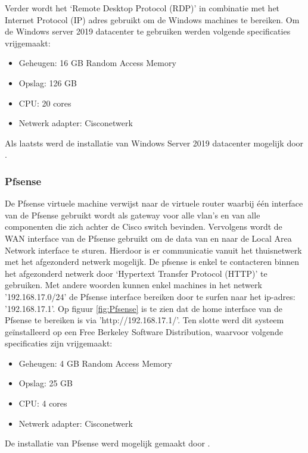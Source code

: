 Verder wordt het ‘Remote Desktop Protocol (RDP)’ in combinatie met het Internet Protocol (IP) adres gebruikt om de Windows machines te bereiken.
\newline
\newline
Om de Windows server 2019 datacenter te gebruiken werden volgende specificaties vrijgemaakt:

\begin{itemize}
	\item Geheugen: 16 GB Random Access Memory
	\item Opslag: 126 GB
	\item CPU: 20 cores
	\item Netwerk adapter: Cisco\textunderscore netwerk
\end{itemize}

Als laatsts werd de installatie van Windows Server 2019 datacenter mogelijk door \cite{Win19_InstallationGuide}. 

\subsubsection{Pfsense}
De Pfsense virtuele machine verwijst naar de virtuele router waarbij één interface van de Pfsense gebruikt wordt als gateway voor alle vlan’s en van alle componenten die zich achter de Cisco switch bevinden. Vervolgens wordt de WAN interface van de Pfsense gebruikt om de data van en naar de Local Area Network interface te sturen. Hierdoor is er communicatie vanuit het thuisnetwerk met het afgezonderd netwerk mogelijk.
\newline
\newline
De pfsense is enkel te contacteren binnen het afgezonderd netwerk door ‘Hypertext Transfer Protocol (HTTP)’ te gebruiken. Met andere woorden kunnen enkel machines in het netwerk '192.168.17.0/24' de Pfsense interface bereiken door te surfen naar het ip-adres: '192.168.17.1'. Op figuur \ref{fig:Pfsense} is te zien dat de home interface van de Pfsense te bereiken is via 'http://192.168.17.1/'.
\newline
\newline
Ten slotte werd dit systeem geïnstalleerd op een Free Berkeley Software Distribution, waarvoor volgende specificaties zijn vrijgemaakt:  

\begin{itemize}
	\item Geheugen: 4 GB Random Access Memory
	\item Opslag: 25 GB
	\item CPU: 4 cores
	\item Netwerk adapter: Cisco\textunderscore netwerk
\end{itemize}
De installatie van Pfsense werd mogelijk gemaakt door \cite{Pfsense_InstallationGuide}.

